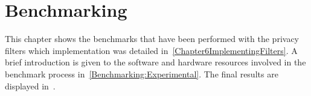 \chapter{Benchmarking} %
\label{Chapter7Benchmarking} %


This chapter shows the benchmarks that have been performed with the privacy filters which implementation was detailed in~\cref{Chapter6ImplementingFilters}. A brief introduction is given to the software and hardware resources involved in the benchmark process in~\ref{Benchmarking:Experimental}. The final results are displayed in~.


